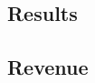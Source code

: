 \documentclass[review,12pt,authoryear]{elsarticle}
\begin{document}
\begin{linenumbers}
\section{Results}



\subsection{Revenue}


\end{linenumbers}
\end{document}
